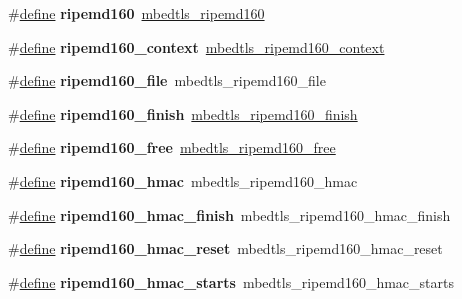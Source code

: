 \begin{DoxyCompactItemize}
\#\hyperlink{structdefine}{define} {\bfseries ripemd160}~\hyperlink{ripemd160_8h_add0b65389ff09a48612b659af67f5667}{mbedtls\+\_\+ripemd160}
\item 
\mbox{\label{compat-1_83_8h_abe295be2014caf44684698bd38424a44}} 
\#\hyperlink{structdefine}{define} {\bfseries ripemd160\+\_\+context}~\hyperlink{structmbedtls__ripemd160__context}{mbedtls\+\_\+ripemd160\+\_\+context}
\item 
\mbox{\label{compat-1_83_8h_a7d188a577c95e84f157eafe5b8c1e127}} 
\#\hyperlink{structdefine}{define} {\bfseries ripemd160\+\_\+file}~mbedtls\+\_\+ripemd160\+\_\+file
\item 
\mbox{\label{compat-1_83_8h_a73fae472a1d8263b064496af584c0251}} 
\#\hyperlink{structdefine}{define} {\bfseries ripemd160\+\_\+finish}~\hyperlink{ripemd160_8h_a816028be7aabafbf2386b2d967e8a801}{mbedtls\+\_\+ripemd160\+\_\+finish}
\item 
\mbox{\label{compat-1_83_8h_aabb700ef92890485de752f28550b2454}} 
\#\hyperlink{structdefine}{define} {\bfseries ripemd160\+\_\+free}~\hyperlink{ripemd160_8h_a8b7b57650be232cb05ae37bc859332d1}{mbedtls\+\_\+ripemd160\+\_\+free}
\item 
\mbox{\label{compat-1_83_8h_a6a108796dfaad1036ae122eac6e3b7fb}} 
\#\hyperlink{structdefine}{define} {\bfseries ripemd160\+\_\+hmac}~mbedtls\+\_\+ripemd160\+\_\+hmac
\item 
\mbox{\label{compat-1_83_8h_a9a921998933c4df72af4634268680425}} 
\#\hyperlink{structdefine}{define} {\bfseries ripemd160\+\_\+hmac\+\_\+finish}~mbedtls\+\_\+ripemd160\+\_\+hmac\+\_\+finish
\item 
\mbox{\label{compat-1_83_8h_aedf68c3e5c442b6c0d25262c791cba11}} 
\#\hyperlink{structdefine}{define} {\bfseries ripemd160\+\_\+hmac\+\_\+reset}~mbedtls\+\_\+ripemd160\+\_\+hmac\+\_\+reset
\item 
\mbox{\label{compat-1_83_8h_a2b775cf8ff55906a55bcbb477c70cd99}} 
\#\hyperlink{structdefine}{define} {\bfseries ripemd160\+\_\+hmac\+\_\+starts}~mbedtls\+\_\+ripemd160\+\_\+hmac\+\_\+starts
\item 

\end{DoxyCompactItemize}
